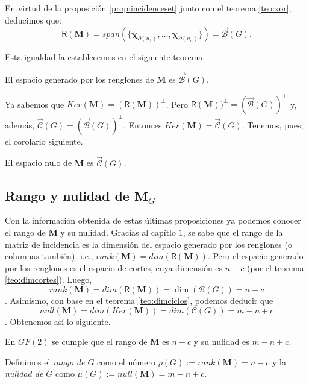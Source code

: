 En virtud de la proposición \ref{prop:incidenceset} junto con el teorema \ref{teo:xor}, deducimos que:
$$
\mathsf{R}(\mathbf{M}) = span(\{ \boldsymbol{\chi}_{\partial(u_{1})}, \ldots, \boldsymbol{\chi}_{\partial(u_{n})} \}) = \overrightarrow{\mathcal{B}}(G).
$$

Esta igualdad la establecemos en el siguiente teorema.

\begin{teo}
El espacio generado por los renglones de $\mathbf{M}$ es $\overrightarrow{\mathcal{B}}(G)$.
\end{teo}

Ya sabemos que $Ker(\mathbf{M}) = (\textsf{R}(\mathbf{M}))^{\perp}$. Pero $\textsf{R}(\mathbf{M}))^{\perp} = (\overrightarrow{\mathcal{B}}(G))^{\perp}$ y, además, $\overrightarrow{\mathcal{C}}(G)=(\overrightarrow{\mathcal{B}}(G))^{\perp}$. Entonces $Ker(\mathbf{M}) =\overrightarrow{\mathcal{C}}(G) $. Tenemos, pues, el corolario siguiente. 

\begin{cor}
El espacio nulo de $\mathbf{M}$ es $\overrightarrow{\mathcal{C}}(G)$.
\end{cor}

\subsection{Rango y nulidad de $\mathbf{M}_{G}$}

Con la información obtenida de estas últimas proposiciones ya podemos conocer el rango de $\mathbf{M}$ y su nulidad. Gracias al capítlo $1$, se sabe que el rango de la matriz de incidencia es la dimensión del espacio generado por los renglones (o columnas también), i.e., $rank(\mathbf{M}) = dim(\mathsf{R}(\mathbf{M}))$. Pero el espacio generado por los renglones es el espacio de cortes, cuya dimensión es $n-c$ (por el teorema \ref{teo:dimcortes}). Luego, $$rank(\mathbf{M}) = dim(\mathsf{R}(\mathbf{M})) = \dim(\mathcal{B}(G)) = n - c$$.  Asimismo, con base en el teorema \ref{teo:dimciclos}, podemos deducir que $$null(\mathbf{M})=dim(Ker(\mathbf{M}))= dim(\mathcal{C}(G)) = m - n + c$$. Obtenemos así lo siguiente.

\begin{teo} 
En $GF(2)$
se cumple que el rango de $\mathbf{M}$ es $n-c$ y su nulidad es $m -n +c$.
\end{teo}

Definimos el \textit{rango de $G$} como el número $\rho(G) :=  rank(\mathbf{M}) = n -c$ y la \textit{nulidad de $G$} como $\mu(G):= null(\mathbf{M}) = m - n + c$.

